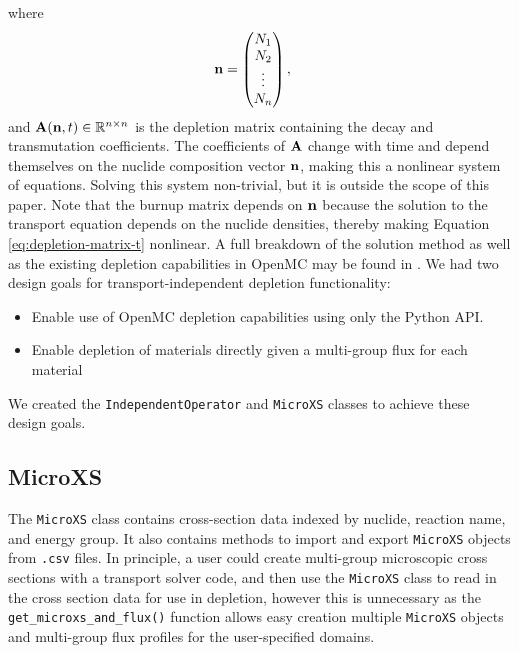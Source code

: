     where
    \begin{equation}
      \mathbf{n} = \begin{pmatrix} N_1 \\ N_2 \\ \vdots \\ N_n \end{pmatrix}, \quad
    \end{equation}
    and $\mathbf{A}(\mathbf{n},t) \in \mathbb{R}^{n\times n}$ is the depletion
    matrix containing the decay and transmutation coefficients. The coefficients
    of $\mathbf{A}$ change with time and depend themselves on the nuclide
    composition vector $\mathbf{n}$, making this a nonlinear system of equations.
    Solving this system non-trivial, but it is outside the scope of this paper.
    Note that the burnup matrix depends on $\mathbf{n}$ because the solution to
    the transport equation depends on the nuclide densities, thereby making
    Equation \ref{eq:depletion-matrix-t} nonlinear. A full breakdown of the
    solution method as well as the existing depletion capabilities in OpenMC may
    be found in \cite{romano_depletion_2021}.  We had two design goals for
    transport-independent depletion functionality:
    \begin{itemize}
        \item Enable use of OpenMC depletion capabilities using only the Python API.
        \item Enable depletion of materials directly given a multi-group flux
            for each material 
    \end{itemize}
    
    We created the \verb.IndependentOperator. and \verb.MicroXS. classes to
    achieve these design goals.    
    \subsection{MicroXS}
        \label{sub:microxs}
        The \verb.MicroXS. class contains cross-section data indexed by nuclide,
        reaction name, and energy group. It also contains methods to import and
        export \verb.MicroXS. objects from \verb,.csv, files. In principle, a
        user could create multi-group microscopic cross sections with a
        transport solver code, and then use the \verb.MicroXS.  class to read in
        the cross section data for use in depletion, however this is unnecessary
        as the \verb.get_microxs_and_flux(). function allows easy creation
        multiple \verb.MicroXS. objects and multi-group flux profiles for the
        user-specified domains.

